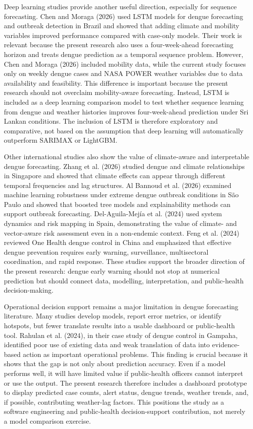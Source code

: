 \documentclass[12pt,a4paper]{article}
\begin{document}
Deep learning studies provide another useful direction, especially for sequence forecasting. Chen and Moraga (2026) used LSTM models for dengue forecasting and outbreak detection in Brazil and showed that adding climate and mobility variables improved performance compared with case-only models. Their work is relevant because the present research also uses a four-week-ahead forecasting horizon and treats dengue prediction as a temporal sequence problem. However, Chen and Moraga (2026) included mobility data, while the current study focuses only on weekly dengue cases and NASA POWER weather variables due to data availability and feasibility. This difference is important because the present research should not overclaim mobility-aware forecasting. Instead, LSTM is included as a deep learning comparison model to test whether sequence learning from dengue and weather histories improves four-week-ahead prediction under Sri Lankan conditions. The inclusion of LSTM is therefore exploratory and comparative, not based on the assumption that deep learning will automatically outperform SARIMAX or LightGBM.

Other international studies also show the value of climate-aware and interpretable dengue forecasting. Zhang et al. (2026) studied dengue and climate relationships in Singapore and showed that climate effects can appear through different temporal frequencies and lag structures. Al Bannoud et al. (2026) examined machine learning robustness under extreme dengue outbreak conditions in São Paulo and showed that boosted tree models and explainability methods can support outbreak forecasting. Del-Aguila-Mejía et al. (2024) used system dynamics and risk mapping in Spain, demonstrating the value of climate- and vector-aware risk assessment even in a non-endemic context. Feng et al. (2024) reviewed One Health dengue control in China and emphasized that effective dengue prevention requires early warning, surveillance, multisectoral coordination, and rapid response. These studies support the broader direction of the present research: dengue early warning should not stop at numerical prediction but should connect data, modelling, interpretation, and public-health decision-making.

Operational decision support remains a major limitation in dengue forecasting literature. Many studies develop models, report error metrics, or identify hotspots, but fewer translate results into a usable dashboard or public-health tool. Rahulan et al. (2024), in their case study of dengue control in Gampaha, identified poor use of existing data and weak translation of data into evidence-based action as important operational problems. This finding is crucial because it shows that the gap is not only about prediction accuracy. Even if a model performs well, it will have limited value if public-health officers cannot interpret or use the output. The present research therefore includes a dashboard prototype to display predicted case counts, alert status, dengue trends, weather trends, and, if possible, contributing weather-lag factors. This positions the study as a software engineering and public-health decision-support contribution, not merely a model comparison exercise.
\end{document}
